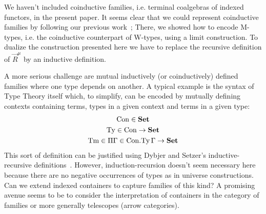 \documentclass[10pt, conference, compsocconf]{IEEEtran}
\begin{document}
We haven't included coinductive families, i.e. terminal coalgebras of
indexed functors, in the present paper. It seems clear that we could
represent coinductive families by following our previous
work~\cite{alti:cont-tcs}; There, 
we showed how to encode M-types, i.e. the coinductive
counterpart of W-types, using a limit construction. To dualize the
construction presented here we have to replace the recursive
definition of $\vec{R}^\mu$ by an inductive definition.

A more serious challenge are mutual inductively (or coinductively)
defined families where one type depends on another. A typical example
is the syntax of Type Theory itself which, to simplify, can be encoded
by mutually defining contexts containing terms, types in a given context 
and terms in a given type:
\begin{gather*}
  \mathrm{Con} \in \mathbf{Set}\\
  \mathrm{Ty} \in \mathrm{Con} \to \mathbf{Set} \\
  \mathrm{Tm} \in \Pi \Gamma\in\mathrm{Con}.\mathrm{Ty}\,\Gamma \to \mathbf{Set}
\end{gather*}
This sort of definition can be justified using Dybjer and Setzer's
inductive-recursive definitions~\cite{DybjerSetzer99,DybjerSetzer06}. 
However, induction-recursion doesn't
seem necessary here because there are no negative occurrences of types
as in universe constructions. Can we extend indexed containers to
capture families of this kind? A promising avenue seems to be to
consider the interpretation of containers in the category of families
or more generally telescopes (arrow categories).




  
\end{document}

